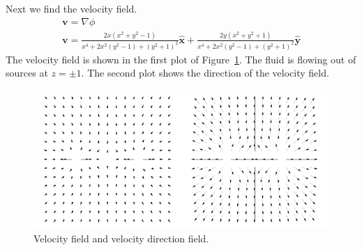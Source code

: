 {\begin{Solution}
\begin{enumerate}
    Next we find the velocity field.
    \begin{gather*}
      \mathbf{v} = \nabla \phi
      \\
      \mathbf{v} = \frac{ 2 x (x^2 + y^2 - 1) }
      { x^4 + 2 x^2 (y^2 - 1) + (y^2 + 1)^2 } \hat{\mathbf{x}}
      + \frac{ 2 y (x^2 + y^2 + 1) }
      { x^4 + 2 x^2 (y^2 - 1) + (y^2 + 1)^2 } \hat{\mathbf{y}}
    \end{gather*}
    The velocity field is shown in the first plot of
    Figure~\ref{figure velocity-field-logz1logz1}.
    The fluid is flowing out of sources at $z = \pm 1$.  The second plot shows
    the direction of the velocity field.
    \begin{figure}[htb!]
      \begin{center}
        \includegraphics[width=\textwidth]{fcv/analytic/velocity-field-logz1logz1}
      \end{center}
      \caption{Velocity field and velocity direction field.}
      \label{figure velocity-field-logz1logz1}
    \end{figure}
  \end{enumerate}
\end{Solution}





}
